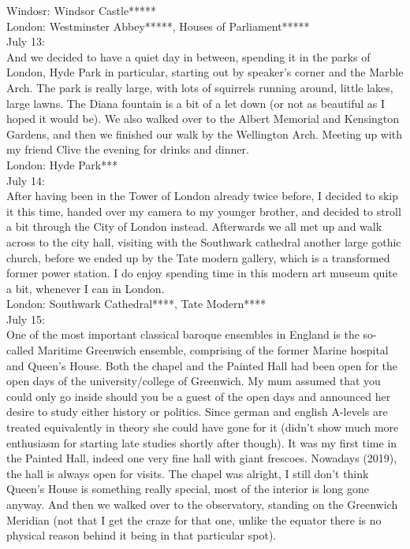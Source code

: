 Windosr: Windsor Castle*****\\
London: Westminster Abbey*****, Houses of Parliament*****\\

July 13:\\
And we decided to have a quiet day in between, spending it in the parks of London, Hyde Park in particular, starting out by speaker's corner and the Marble Arch. The park is really large, with lots of squirrels running around, little lakes, large lawns. The Diana fountain is a bit of a let down (or not as beautiful as I hoped it would be). We also walked over to the Albert Memorial and Kensington Gardens, and then we finished our walk by the Wellington Arch. Meeting up with my friend Clive the evening for drinks and dinner.\\

London: Hyde Park***\\

July 14:\\
After having been in the Tower of London already twice before, I decided to skip it this time, handed over my camera to my younger brother, and decided to stroll a bit through the City of London instead. Afterwards we all met up and walk across to the city hall, visiting with the Southwark cathedral another large gothic church, before we ended up by the Tate modern gallery, which is a transformed former power station. I do enjoy spending time in this modern art museum quite a bit, whenever I can in London.\\

London: Southwark Cathedral****,  Tate Modern****\\

July 15:\\
One of the most important classical baroque ensembles in England is the so-called Maritime Greenwich ensemble, comprising of the former Marine hospital and Queen's House. Both the chapel and the Painted Hall had been open for the open days of the university/college of Greenwich. My mum assumed that you could only go inside should you be a guest of the open days and announced her desire to study either history or politics. Since german and english A-levels are treated equivalently in theory she could have gone for it (didn't show much more enthusiasm for starting late studies shortly after though). It was my first time in the Painted Hall, indeed one very fine hall with giant frescoes. Nowadays (2019), the hall is always open for visits. The chapel was alright, I still don't think Queen's House is something really special, most of the interior is long gone anyway. And then we walked over to the observatory, standing on the Greenwich Meridian (not that I get the craze for that one, unlike the equator there is no physical reason behind it being in that particular spot).\\

